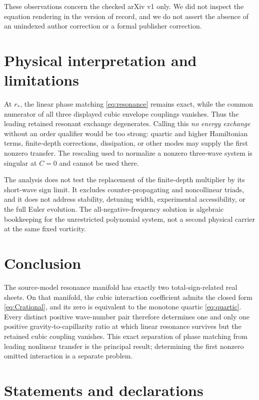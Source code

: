 \documentclass[11pt]{article}
\theoremstyle{remark}
\begin{document}
These observations concern the checked arXiv v1 only. We did not inspect the
equation rendering in the version of record, and we do not assert the absence
of an unindexed author correction or a formal publisher correction.

\section{Physical interpretation and limitations}

At \(r_*\), the linear phase matching \eqref{eq:resonance} remains exact,
while the common numerator of all three displayed cubic envelope couplings
vanishes. Thus the leading retained resonant exchange degenerates. Calling
this \emph{no energy exchange} without an order qualifier would be too strong:
quartic and higher Hamiltonian terms, finite-depth corrections, dissipation,
or other modes may supply the first nonzero transfer. The rescaling used to
normalize a nonzero three-wave system is singular at \(C=0\) and cannot be
used there.

The analysis does not test the replacement of the finite-depth multiplier by
its short-wave sign limit. It excludes counter-propagating and noncollinear
triads, and it does not address stability, detuning width, experimental
accessibility, or the full Euler evolution. The all-negative-frequency
solution is algebraic bookkeeping for the unrestricted polynomial system,
not a second physical carrier at the same fixed vorticity.

\section{Conclusion}

The source-model resonance manifold has exactly two total-sign-related real
sheets. On that manifold, the cubic interaction coefficient admits the
closed form \eqref{eq:Crational}, and its zero is equivalent to the monotone
quartic \eqref{eq:quartic}. Every distinct positive wave-number pair
therefore determines one and only one positive gravity-to-capillarity ratio
at which linear resonance survives but the retained cubic coupling
vanishes. This exact separation of phase matching from leading nonlinear
transfer is the principal result; determining the first nonzero omitted
interaction is a separate problem.

\section*{Statements and declarations}
\end{document}
